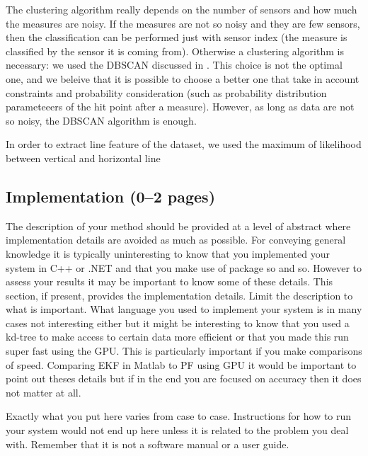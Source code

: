 \documentclass[a4paper,12pt]{article}
\begin{document}
The clustering algorithm really depends on the number of sensors and how much the measures are noisy. If the measures are not so noisy and they are few sensors, then the classification can be performed just with sensor index (the measure is classified by the sensor it is coming from).
Otherwise a clustering algorithm is necessary: we used the DBSCAN discussed in \cite{ester1996density}.
This choice is not the optimal one, and we beleive that it is possible to choose a better one that take in account constraints and probability consideration (such as  probability distribution parameteeers of the hit point after a measure).
However, as long as data are not so noisy, the DBSCAN algorithm is enough.

In order to extract line feature of the dataset, we used the maximum of likelihood between vertical and horizontal line








\subsection{Implementation (0--2 pages)}

The description of your method should be provided at a level of
abstract where implementation details are avoided as much as
possible. For conveying general knowledge it is typically
uninteresting to know that you implemented your system in C++ or .NET
and that you make use of package so and so. However to assess your
results it may be important to know some of these details. This
section, if present, provides the implementation details. Limit the
description to what is important.  What language you used to implement
your system is in many cases not interesting either but it might be
interesting to know that you used a kd-tree to make access to certain
data more efficient or that you made this run super fast using the
GPU.  This is particularly important if you make comparisons of speed.
Comparing EKF in Matlab to PF using GPU it would be important to point
out theses details but if in the end you are focused on accuracy then
it does not matter at all.

Exactly what you put here varies from case to case. Instructions for
how to run your system would not end up here unless it is related to
the problem you deal with. Remember that it is not a software manual
or a user guide.
\end{document}
